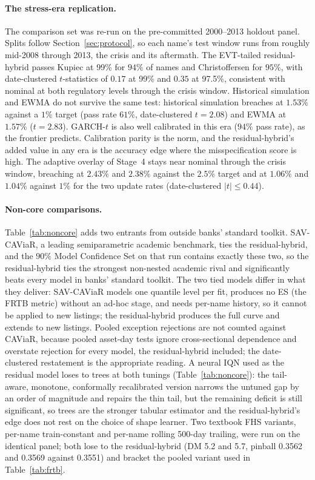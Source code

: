 \documentclass[11pt]{article}
\theoremstyle{remark}
\begin{document}
\paragraph{The stress-era replication.} The comparison set was re-run on the pre-committed 2000--2013 holdout panel. Splits follow
Section~\ref{sec:protocol}, so each name's test window runs from
roughly mid-2008 through 2013, the crisis and its aftermath. The
EVT-tailed residual-hybrid passes Kupiec at 99\% for $94\%$ of names and
Christoffersen for $95\%$, with date-clustered $t$-statistics of
$0.17$ at 99\% and $0.35$ at 97.5\%, consistent with nominal at both regulatory levels through the crisis window. Historical simulation and EWMA do not survive the same test: historical simulation
breaches at $1.53\%$ against a $1\%$ target (pass rate $61\%$,
date-clustered $t=2.08$) and EWMA at $1.57\%$ ($t=2.83$). GARCH-$t$ is also well calibrated in this era ($94\%$ pass rate), as the frontier predicts. Calibration parity is the norm, and the residual-hybrid's added value in any era is the accuracy edge where the misspecification score is high. The adaptive overlay of Stage~4 stays near nominal through the crisis window, breaching at $2.43\%$ and $2.38\%$ against the $2.5\%$ target and at $1.06\%$ and $1.04\%$ against $1\%$ for the two update rates (date-clustered $|t|\le0.44$).

\paragraph{Non-core comparisons.} Table~\ref{tab:noncore} adds two entrants from outside banks' standard toolkit. SAV-CAViaR, a leading semiparametric academic benchmark, ties the residual-hybrid, and the $90\%$ Model Confidence Set on that run contains exactly these two, so the residual-hybrid ties the strongest non-nested academic rival and significantly beats every model in banks' standard toolkit. The two tied models differ in what they deliver: SAV-CAViaR models one quantile level per fit, produces no ES (the FRTB metric) without an ad-hoc stage, and needs per-name history, so it cannot be applied to new listings; the residual-hybrid produces the full curve and extends to new listings. Pooled exception rejections are not counted against CAViaR, because pooled asset-day tests ignore cross-sectional dependence and overstate rejection for every model, the residual-hybrid included; the date-clustered restatement is the appropriate reading. A neural IQN used as the residual model loses to trees at both tunings (Table~\ref{tab:noncore}): the tail-aware, monotone, conformally recalibrated version narrows the untuned gap by an order of magnitude and repairs the thin tail, but the remaining deficit is still significant, so trees are the stronger tabular estimator and the residual-hybrid's edge does not rest on the choice of shape learner. Two textbook FHS variants, per-name train-constant and per-name rolling 500-day trailing, were run on the identical panel; both lose to the residual-hybrid (DM 5.2 and 5.7, pinball 0.3562 and 0.3569 against 0.3551) and bracket the pooled variant used in Table~\ref{tab:frtb}.
\end{document}
